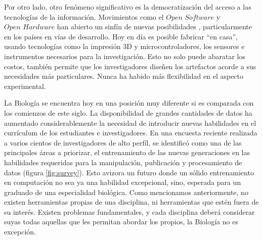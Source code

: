 Por otro lado, otro fenómeno significativo es la democratización del acceso a las tecnologías de la información.
Movimientos como el $\textit{Open Software}$ y $\textit{Open Hardware}$ han abierto un sinfín de nuevas posibilidades \cite{ravindranHowDIYTechnologies2020}, particularmente en los países en vías de desarrollo.
Hoy en día es posible fabricar ``en casa'', usando tecnologías como la impresión 3D y microcontroladores, los sensores e instrumentos necesarios para la investigación.
Esto no solo puede abaratar los costos, también permite que los investigadores diseñen los artefactos acorde a sus necesidades más particulares.
Nunca ha habido más flexibilidad en el aspecto experimental.

La Biología se encuentra hoy en una posición muy diferente si es comparada con los comienzos de este siglo.
La disponibilidad de grandes cantidades de datos ha aumentado considerablemente la necesidad de introducir nuevas habilidades en el currículum de los estudiantes e investigadores.
En una encuesta reciente realizada a varios cientos de investigadores de alto perfíl, se identificó como una de las principales áreas a priorizar, el entrenamiento de las nuevas generaciones en las habilidades requeridas para la manipulación, publicación y procesamiento de datos \cite{baroneUnmetNeedsAnalyzing2017} (figura \ref{fig:survey}).
Esto avizora un futuro donde un sólido entrenamiento en computación no sea ya una habilidad excepcional, sino, esperada para un graduado de una especialidad biológica.
Como mencionamos anteriormente, no existen herramientas propias de una disciplina, ni herramientas que estén fuera de su interés. Existen problemas fundamentales, y cada disciplina deberá considerar suyas todas aquellas que les permitan abordar los propios, la Biología no es excepción.
 
\rightline{$\blacksquare$}
 

